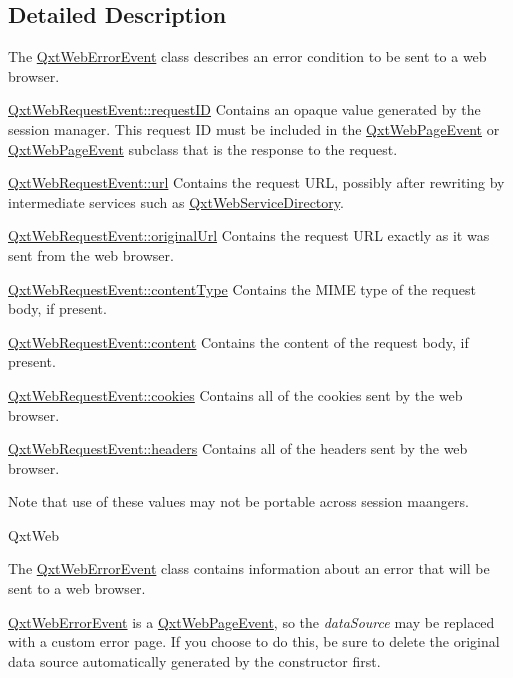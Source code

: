 \subsection{Detailed Description}
The \hyperlink{class_qxt_web_error_event}{Qxt\-Web\-Error\-Event} class describes an error condition to be sent to a web browser. 

\hyperlink{class_qxt_web_request_event_a79e20dd1cbc06f8cf1abe47bf6360277}{Qxt\-Web\-Request\-Event\-::request\-I\-D} Contains an opaque value generated by the session manager. This request I\-D must be included in the \hyperlink{class_qxt_web_page_event}{Qxt\-Web\-Page\-Event} or \hyperlink{class_qxt_web_page_event}{Qxt\-Web\-Page\-Event} subclass that is the response to the request.

\hyperlink{class_qxt_web_request_event_a7478ca98a01fddf7b22b4c0f79c9d0a8}{Qxt\-Web\-Request\-Event\-::url} Contains the request U\-R\-L, possibly after rewriting by intermediate services such as \hyperlink{class_qxt_web_service_directory}{Qxt\-Web\-Service\-Directory}.

\hyperlink{class_qxt_web_request_event_a0a4ad2f21fe52a1559508b1df842f540}{Qxt\-Web\-Request\-Event\-::original\-Url} Contains the request U\-R\-L exactly as it was sent from the web browser.

\hyperlink{class_qxt_web_request_event_a7be4586ea32c7e6a968f824f4618bdd7}{Qxt\-Web\-Request\-Event\-::content\-Type} Contains the M\-I\-M\-E type of the request body, if present.

\hyperlink{class_qxt_web_request_event_ac6bc9d31ef80c6e739c0859b994bc950}{Qxt\-Web\-Request\-Event\-::content} Contains the content of the request body, if present.

\hyperlink{class_qxt_web_request_event_afa70604b2da01c5d6f00d0d6b0214599}{Qxt\-Web\-Request\-Event\-::cookies} Contains all of the cookies sent by the web browser.

\hyperlink{class_qxt_web_request_event_aa8beef38086e9b74c1bedb238d80d0fe}{Qxt\-Web\-Request\-Event\-::headers} Contains all of the headers sent by the web browser.

Note that use of these values may not be portable across session maangers.

Qxt\-Web

The \hyperlink{class_qxt_web_error_event}{Qxt\-Web\-Error\-Event} class contains information about an error that will be sent to a web browser.

\hyperlink{class_qxt_web_error_event}{Qxt\-Web\-Error\-Event} is a \hyperlink{class_qxt_web_page_event}{Qxt\-Web\-Page\-Event}, so the {\itshape data\-Source} may be replaced with a custom error page. If you choose to do this, be sure to delete the original data source automatically generated by the constructor first. 

